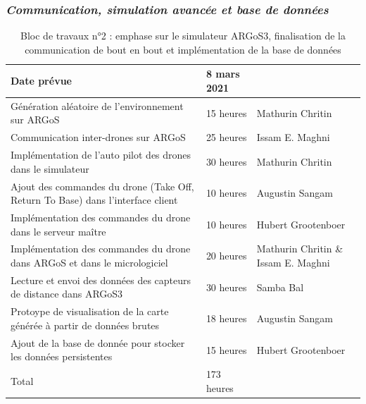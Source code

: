 \documentclass{mistcoursedoc}
\begin{document}
\newpage\subsubsection{\emph{Communication, simulation avancée et base de données}}

\begin{table}[h!]
  \centering
  \begin{tabular}{ M{7cm}M{3cm}M{3.5cm} }\hline
    Date prévue                                              & 8 mars 2021  & \tabularnewline\hline
    Génération aléatoire de l’environnement sur ARGoS           & 15 heures & Mathurin Chritin \tabularnewline
    Communication inter-drones sur ARGoS                        & 25 heures & Issam E. Maghni \tabularnewline
    Implémentation de l'auto pilot des drones dans le simulateur & 30 heures & Mathurin Chritin\tabularnewline
    Ajout des commandes du drone (Take Off, Return To Base) dans l’interface client         & 10 heures  & Augustin Sangam \tabularnewline
    Implémentation des commandes du drone dans le serveur maître                & 10 heures  & Hubert Grootenboer \tabularnewline
    Implémentation des commandes du drone dans ARGoS et dans le micrologiciel               & 20 heures  & Mathurin Chritin \& Issam E. Maghni \tabularnewline
    Lecture et envoi des données des capteurs de distance dans ARGoS3                   & 30 heures & Samba Bal \tabularnewline
    Protoype de visualisation de la carte générée à partir de données brutes & 18 heures & Augustin Sangam \tabularnewline
    Ajout de la base de donnée pour stocker les données persistentes     & 15 heures & Hubert Grootenboer \tabularnewline\hline
    Total & 173 heures & \tabularnewline\hline
  \end{tabular}
  \caption{Bloc de travaux n°2 : emphase sur le simulateur ARGoS3, finalisation de la communication de bout en bout et implémentation de la base de données}
\end{table}
\end{document}
